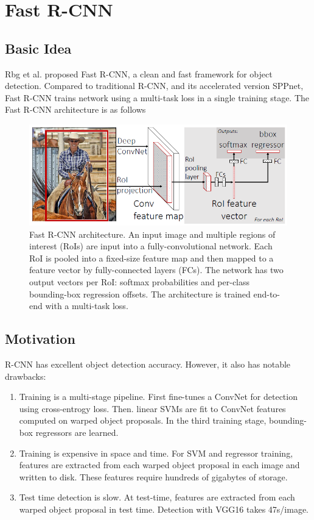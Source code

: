 \documentclass[a4paper]{article}
\begin{document}
  \section{Fast R-CNN}
    
      \subsection{Basic Idea}
          Rbg et al. proposed Fast R-CNN, a clean and fast framework for object detection. Compared to traditional R-CNN, and its accelerated version SPPnet, Fast R-CNN trains network using a multi-task loss in a single training stage. The Fast R-CNN architecture is as follows
          \begin{figure}[h]
          \centering
          \includegraphics[width=0.7\linewidth]{screenshot003}
          \caption{Fast R-CNN architecture. An input image and multiple
              regions of interest (RoIs) are input into a fully-convolutional
              network. Each RoI is pooled into a fixed-size feature map and
              then mapped to a feature vector by fully-connected layers (FCs).
              The network has two output vectors per RoI: softmax probabilities
              and per-class bounding-box regression offsets. The architecture is trained end-to-end with a multi-task loss.}
          \label{fig:screenshot003}
          \end{figure}

      \subsection{Motivation}
        R-CNN has excellent object detection accuracy. However, it also has notable drawbacks:
        \begin{enumerate}
          \item Training is a multi-stage pipeline. First fine-tunes a ConvNet for detection using cross-entrogy loss. Then. linear SVMs are fit to ConvNet features computed on warped object proposals. In the third training stage, bounding-box regressors are learned.
          \item Training is expensive in space and time. For SVM and regressor training, features are extracted from each warped object proposal in each image and written to disk. These features require hundreds of gigabytes of storage.
          \item Test time detection is slow. At test-time, features are extracted from each warped object proposal in test time. Detection with VGG16 takes 47s/image.
        \end{enumerate}
\end{document}
